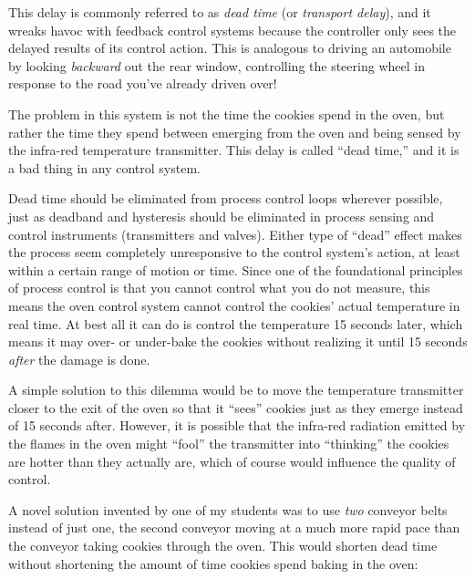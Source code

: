 
This delay is commonly referred to as {\it dead time} (or {\it transport delay}), and it wreaks havoc with feedback control systems because the controller only sees the delayed results of its control action.  This is analogous to driving an automobile by looking {\it backward} out the rear window, controlling the steering wheel in response to the road you've already driven over!







The problem in this system is not the time the cookies spend in the oven, but rather the time they spend between emerging from the oven and being sensed by the infra-red temperature transmitter.  This delay is called ``dead time,'' and it is a bad thing in any control system.

Dead time should be eliminated from process control loops wherever possible, just as deadband and hysteresis should be eliminated in process sensing and control instruments (transmitters and valves).  Either type of ``dead'' effect makes the process seem completely unresponsive to the control system's action, at least within a certain range of motion or time.  Since one of the foundational principles of process control is that you cannot control what you do not measure, this means the oven control system cannot control the cookies' actual temperature in real time.  At best all it can do is control the temperature 15 seconds later, which means it may over- or under-bake the cookies without realizing it until 15 seconds {\it after} the damage is done.

\vskip 10pt

A simple solution to this dilemma would be to move the temperature transmitter closer to the exit of the oven so that it ``sees'' cookies just as they emerge instead of 15 seconds after.  However, it is possible that the infra-red radiation emitted by the flames in the oven might ``fool'' the transmitter into ``thinking'' the cookies are hotter than they actually are, which of course would influence the quality of control.

A novel solution invented by one of my students was to use {\it two} conveyor belts instead of just one, the second conveyor moving at a much more rapid pace than the conveyor taking cookies through the oven.  This would shorten dead time without shortening the amount of time cookies spend baking in the oven:

